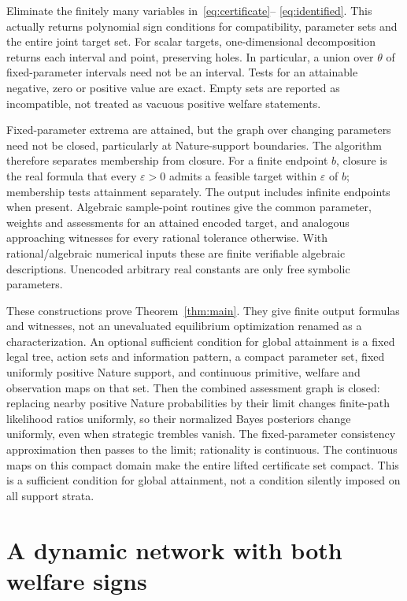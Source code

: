 \documentclass[11pt,a4paper]{article}
\numberwithin{equation}{section}
\theoremstyle{definition}
\begin{document}
Eliminate the finitely many variables in~\eqref{eq:certificate}--
\eqref{eq:identified}. This actually returns polynomial sign conditions
for compatibility, parameter sets and the entire joint target set.
For scalar targets, one-dimensional decomposition returns each interval
and point, preserving holes. In particular, a union over $\theta$ of
fixed-parameter intervals need not be an interval. Tests for an attainable
negative, zero or positive value are exact. Empty sets are reported as
incompatible, not treated as vacuous positive welfare statements.

Fixed-parameter extrema are attained, but the graph over changing
parameters need not be closed, particularly at Nature-support boundaries.
The algorithm therefore separates membership from closure. For a finite
endpoint $b$, closure is the real formula that every $\varepsilon>0$
admits a feasible target within $\varepsilon$ of $b$; membership tests
attainment separately. The output includes infinite endpoints when present.
Algebraic sample-point routines give the common parameter, weights and
assessments for an attained encoded target, and analogous approaching
witnesses for every rational tolerance otherwise. With rational/algebraic
numerical inputs these are finite verifiable algebraic descriptions.
Unencoded arbitrary real constants are only free symbolic parameters.

These constructions prove Theorem~\ref{thm:main}. They give finite
output formulas and witnesses, not an unevaluated equilibrium optimization
renamed as a characterization. An optional sufficient condition for global
attainment is a fixed legal tree, action sets and information pattern,
a compact parameter set, fixed uniformly positive Nature support,
and continuous primitive, welfare and observation maps on that set.
Then the combined assessment graph is closed:
replacing nearby positive Nature probabilities by their limit changes
finite-path likelihood ratios uniformly, so their normalized Bayes
posteriors change uniformly, even when strategic trembles vanish.
The fixed-parameter consistency approximation then passes to the limit;
rationality is continuous. The continuous maps on this compact domain
make the entire lifted certificate set compact. This is a sufficient
condition for global
attainment, not a condition silently imposed on all support strata.

\section{A dynamic network with both welfare signs}\label{sec:dynamic}
\end{document}
